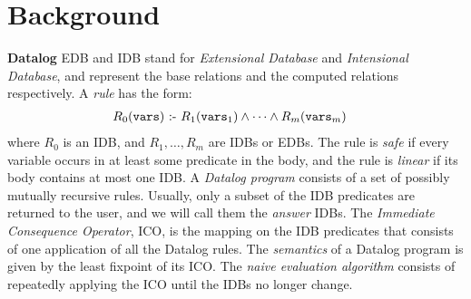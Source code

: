 

\section{Background}

\label{sec:background}


{\bf Datalog}  EDB and
IDB stand for {\em Extensional Database} and {\em Intensional
  Database}, and represent the base relations and the computed
relations respectively.  A {\em rule} has the form:
%
\begin{align*}
  R_0(\texttt{vars}) \text{ :- } & R_1(\texttt{vars}_1) \wedge \cdots \wedge R_m(\texttt{vars}_m)
\end{align*}
%
where $R_0$ is an IDB, and $R_1, \ldots, R_m$ are IDBs or EDBs.  The
rule is {\em safe} if every variable occurs in at least some predicate
in the body, and the rule is {\em linear} if its body contains at most
one IDB.  A {\em Datalog program} consists of a set of possibly
mutually recursive rules.  Usually, only a subset of the IDB
predicates are returned to the user, and we will call them the {\em
  answer} IDBs.  The {\em Immediate Consequence Operator}, ICO, is the
mapping on the IDB predicates that consists of one application of all
the Datalog rules.  The {\em semantics} of a Datalog program is given
by the least fixpoint of its ICO.  The {\em naive evaluation
  algorithm} consists of repeatedly applying the ICO until the IDBs no
longer change.

